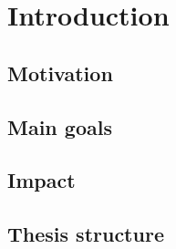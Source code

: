 \chapter{Introduction}



\section{Motivation}



\section{Main goals}

\section{Impact}

\section{Thesis structure}

